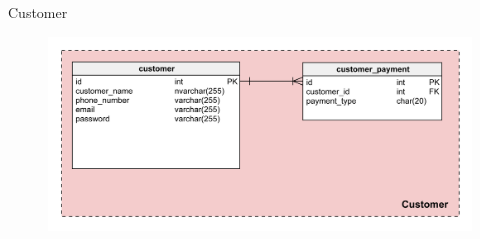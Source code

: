 \documentclass[aspectratio=43,xcolor=dvipsnames]{beamer}
\begin{document}
	\begin{frame}{Customer}
		\begin{figure}[ht!]
			\centerline{\includegraphics[width=1\textwidth]{customer.png}}
			\label{fig:ass1}
		\end{figure}
	\end{frame}
\end{document}
